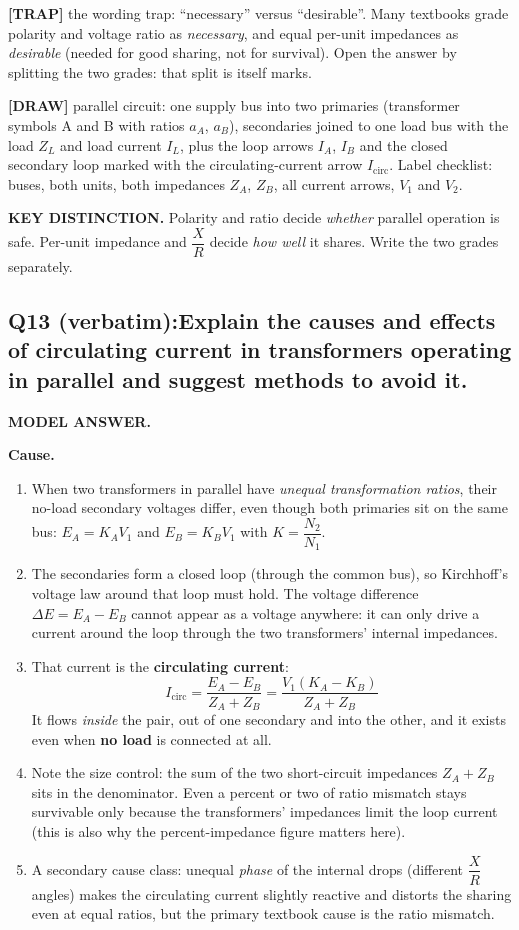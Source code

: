 \documentclass[11pt]{article}
\newcommand{\qhead}[2]{\subsection*{\color{copper}#1\quad\color{iron}#2}}
\newcommand{\tagline}[1]{\textbf{\color{copper}#1}}
\newcommand{\keydist}[1]{\vspace{2pt}\textbf{\color{red}KEY DISTINCTION.} #1}
\newcommand{\drawline}[1]{\textbf{\color{muted}[DRAW]} #1}
\newcommand{\trap}[1]{\vspace{2pt}\textbf{\color{red}[TRAP]} #1}
\begin{document}
\trap{the wording trap: ``necessary'' versus ``desirable''. Many textbooks grade polarity and voltage ratio as \emph{necessary}, and equal per-unit impedances as \emph{desirable} (needed for good sharing, not for survival). Open the answer by splitting the two grades: that split is itself marks.}

\drawline{parallel circuit: one supply bus into two primaries (transformer symbols A and B with ratios $a_A$, $a_B$), secondaries joined to one load bus with the load $Z_L$ and load current $I_L$, plus the loop arrows $I_A$, $I_B$ and the closed secondary loop marked with the circulating-current arrow $I_{\text{circ}}$. Label checklist: buses, both units, both impedances $Z_A$, $Z_B$, all current arrows, $V_1$ and $V_2$.}

\keydist{Polarity and ratio decide \emph{whether} parallel operation is safe. Per-unit impedance and $\dfrac{X}{R}$ decide \emph{how well} it shares. Write the two grades separately.}

\qhead{Q13 (verbatim):}{Explain the causes and effects of circulating current in transformers operating in parallel and suggest methods to avoid it.}

\tagline{MODEL ANSWER.}

\textbf{Cause.}
\begin{enumerate}[label=\arabic*.]
\item When two transformers in parallel have \emph{unequal transformation ratios}, their no-load secondary voltages differ, even though both primaries sit on the same bus: $E_A = K_A V_1$ and $E_B = K_B V_1$ with $K = \dfrac{N_2}{N_1}$.
\item The secondaries form a closed loop (through the common bus), so Kirchhoff's voltage law around that loop must hold. The voltage difference $\Delta E = E_A - E_B$ cannot appear as a voltage anywhere: it can only drive a current around the loop through the two transformers' internal impedances.
\item That current is the \textbf{circulating current}:
\[
I_{\text{circ}} = \frac{E_A - E_B}{Z_A + Z_B} = \frac{V_1\left(K_A - K_B\right)}{Z_A + Z_B}
\]
It flows \emph{inside} the pair, out of one secondary and into the other, and it exists even when \textbf{no load} is connected at all.
\item Note the size control: the sum of the two short-circuit impedances $Z_A + Z_B$ sits in the denominator. Even a percent or two of ratio mismatch stays survivable only because the transformers' impedances limit the loop current (this is also why the percent-impedance figure matters here).
\item A secondary cause class: unequal \emph{phase} of the internal drops (different $\dfrac{X}{R}$ angles) makes the circulating current slightly reactive and distorts the sharing even at equal ratios, but the primary textbook cause is the ratio mismatch.
\end{enumerate}
\end{document}
